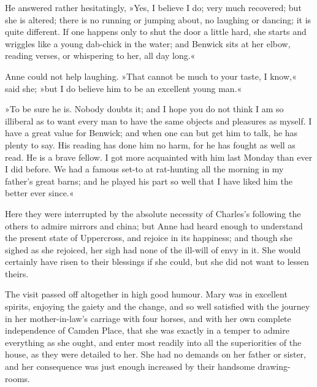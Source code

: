 He answered rather hesitatingly, »Yes, I believe I do; very much recovered; but she is altered; there is no running or jumping about, no laughing or dancing; it is quite different. If one happens only to shut the door a little hard, she starts and wriggles like a young dab-chick in the water; and Benwick sits at her elbow, reading verses, or whispering to her, all day long.«

Anne could not help laughing. »That cannot be much to your taste, I know,« said she; »but I do believe him to be an excellent young man.«

»To be sure he is. Nobody doubts it; and I hope you do not think I am so illiberal as to want every man to have the same objects and pleasures as myself. I have a great value for Benwick; and when one can but get him to talk, he has plenty to say. His reading has done him no harm, for he has fought as well as read. He is a brave fellow. I got more acquainted with him last Monday than ever I did before. We had a famous set-to at rat-hunting all the morning in my father's great barns; and he played his part so well that I have liked him the better ever since.«

Here they were interrupted by the absolute necessity of Charles's following the others to admire mirrors and china; but Anne had heard enough to understand the present state of Uppercross, and rejoice in its happiness; and though she sighed as she rejoiced, her sigh had none of the ill-will of envy in it. She would certainly have risen to their blessings if she could, but she did not want to lessen theirs.

The visit passed off altogether in high good humour. Mary was in excellent spirits, enjoying the gaiety and the change, and so well satisfied with the journey in her mother-in-law's carriage with four horses, and with her own complete independence of Camden Place, that she was exactly in a temper to admire everything as she ought, and enter most readily into all the superiorities of the house, as they were detailed to her. She had no demands on her father or sister, and her consequence was just enough increased by their handsome drawing-rooms.

